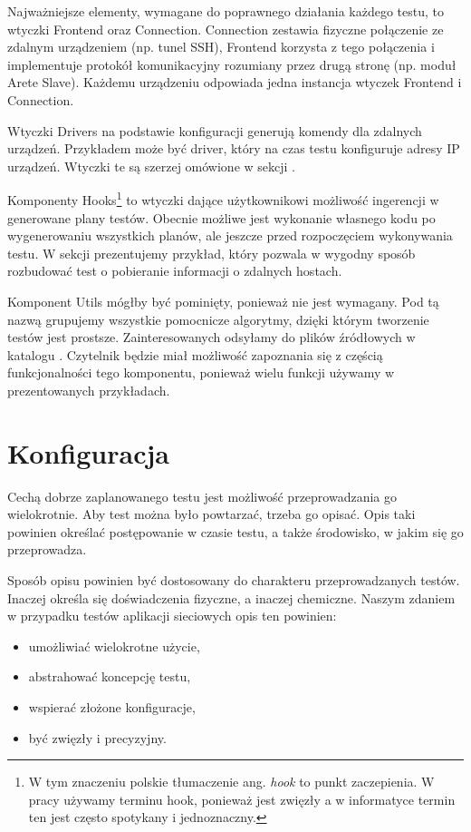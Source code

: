 \documentclass[00-praca-magisterska.tex]{subfiles}
\begin{document}
Najważniejsze elementy, wymagane do poprawnego działania każdego testu, to
wtyczki Frontend oraz Connection. Connection zestawia fizyczne połączenie ze
zdalnym urządzeniem (np. tunel SSH), Frontend korzysta z tego połączenia i
implementuje protokół komunikacyjny rozumiany przez drugą stronę (np. moduł
Arete Slave). Każdemu urządzeniu odpowiada jedna instancja wtyczek Frontend i
Connection.

Wtyczki Drivers na podstawie konfiguracji generują komendy dla zdalnych
urządzeń. Przykładem może być driver, który na czas testu konfiguruje adresy IP
urządzeń. Wtyczki te są szerzej omówione w sekcji .

Komponenty Hooks\footnote{W tym znaczeniu polskie tłumaczenie ang. \emph{hook}
to punkt zaczepienia. W pracy używamy terminu hook, ponieważ jest zwięzły a w
informatyce termin ten jest często spotykany i jednoznaczny.} to wtyczki dające
użytkownikowi możliwość ingerencji w generowane plany testów. Obecnie możliwe
jest wykonanie własnego kodu po wygenerowaniu wszystkich planów, ale jeszcze
przed rozpoczęciem wykonywania testu. W sekcji 
prezentujemy przykład, który pozwala w wygodny sposób rozbudować test o
pobieranie informacji o zdalnych hostach.

Komponent Utils mógłby być pominięty, ponieważ nie jest wymagany. Pod tą nazwą
grupujemy wszystkie pomocnicze algorytmy, dzięki którym tworzenie testów jest
prostsze. Zainteresowanych odsyłamy do plików źródłowych w katalogu
. Czytelnik będzie miał możliwość zapoznania się z częścią
funkcjonalności tego komponentu, ponieważ wielu funkcji używamy w
prezentowanych przykładach.

\section{Konfiguracja}

Cechą dobrze zaplanowanego testu jest możliwość przeprowadzania go
wielokrotnie. Aby test można było powtarzać, trzeba go opisać. Opis taki
powinien określać postępowanie w czasie testu, a także środowisko, w jakim się
go przeprowadza.

Sposób opisu powinien być dostosowany do charakteru przeprowadzanych testów.
Inaczej określa się doświadczenia fizyczne, a inaczej chemiczne. Naszym
zdaniem w przypadku testów aplikacji sieciowych opis ten powinien:
\begin{itemize}
\item umożliwiać wielokrotne użycie,
\item abstrahować koncepcję testu,
\item wspierać złożone konfiguracje,
\item być zwięzły i precyzyjny.
\end{itemize}
\end{document}
